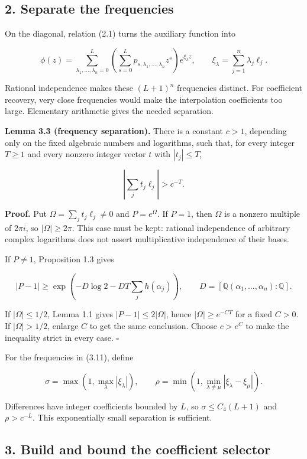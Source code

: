 \documentclass[
  11pt,
  a4paper,
]{article}
\begin{document}
\subsection{2. Separate the frequencies}\label{separate-the-frequencies}

On the diagonal, relation (2.1) turns the auxiliary function into

\[
\phi(z)=\sum_{\lambda_1,\ldots,\lambda_n=0}^{L}
\left(\sum_{s=0}^{L}p_{s,\lambda_1,\ldots,\lambda_n}z^s\right)e^{\xi_\lambda z},
\qquad \xi_\lambda=\sum_{j=1}^n\lambda_j\ell_j. \tag{3.11}
\]

Rational independence makes these \((L+1)^n\) frequencies distinct. For
coefficient recovery, very close frequencies would make the
interpolation coefficients too large. Elementary arithmetic gives the
needed separation.

\textbf{Lemma 3.3 (frequency separation).} There is a constant \(c>1\),
depending only on the fixed algebraic numbers and logarithms, such that,
for every integer \(T\ge1\) and every nonzero integer vector \(t\) with
\(|t_j|\le T\),

\[
\left|\sum_jt_j\ell_j\right|>c^{-T}. \tag{3.12}
\]

\textbf{Proof.} Put \(\Omega=\sum_jt_j\ell_j\ne0\) and \(P=e^\Omega\).
If \(P=1\), then \(\Omega\) is a nonzero multiple of \(2\pi i\), so
\(|\Omega|\ge2\pi\). This case must be kept: rational independence of
arbitrary complex logarithms does not assert multiplicative independence
of their bases.

If \(P\ne1\), Proposition 1.3 gives

\[
|P-1|\ge\exp\left(-D\log2-DT\sum_jh(\alpha_j)\right),
\qquad D=[\mathbb Q(\alpha_1,\ldots,\alpha_n):\mathbb Q].
\]

If \(|\Omega|\le1/2\), Lemma 1.1 gives \(|P-1|\le2|\Omega|\), hence
\(|\Omega|\ge e^{-CT}\) for a fixed \(C>0\). If \(|\Omega|>1/2\),
enlarge \(C\) to get the same conclusion. Choose \(c>e^C\) to make the
inequality strict in every case. \(\square\)

For the frequencies in (3.11), define

\[
\sigma=\max(1,\max_\lambda|\xi_\lambda|),\qquad
\rho=\min(1,\min_{\lambda\ne\mu}|\xi_\lambda-\xi_\mu|).
\]

Differences have integer coefficients bounded by \(L\), so
\(\sigma\le C_4(L+1)\) and \(\rho>c^{-L}\). This exponentially small
separation is sufficient.

\subsection{3. Build and bound the coefficient
selector}\label{build-and-bound-the-coefficient-selector}
\end{document}

